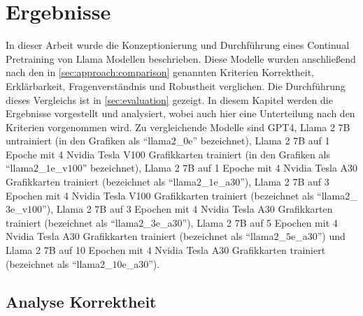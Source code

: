 \chapter{Ergebnisse}\label{ch:results}
In dieser Arbeit wurde die Konzeptionierung und Durchführung eines Continual Pretraining von Llama Modellen beschrieben.
Diese Modelle wurden anschließend nach den in \cref{sec:approach:comparison} genannten Kriterien Korrektheit, Erklärbarkeit, Fragenverständnis und Robustheit verglichen.
Die Durchführung dieses Vergleichs ist in \cref{sec:evaluation} gezeigt.
In diesem Kapitel werden die Ergebnisse vorgestellt und analysiert, wobei auch hier eine Unterteilung nach den Kriterien vorgenommen wird.
Zu vergleichende Modelle sind GPT4,
Llama 2 7B untrainiert (in den Grafiken als \enquote{llama$2$\_$0$e} bezeichnet),
Llama 2 7B auf 1 Epoche mit 4 Nvidia Tesla V100 Grafikkarten trainiert (in den Grafiken als \enquote{llama$2$\_$1$e\_v$100$} bezeichnet),
Llama 2 7B auf 1 Epoche mit 4 Nvidia Tesla A30 Grafikkarten trainiert (bezeichnet als \enquote{llama$2$\_$1$e\_a$30$}),
Llama 2 7B auf 3 Epochen mit 4 Nvidia Tesla V100 Grafikkarten trainiert (bezeichnet als \enquote{llama$2$\_$3$e\_v$100$}),
Llama 2 7B auf 3 Epochen mit 4 Nvidia Tesla A30 Grafikkarten trainiert (bezeichnet als \enquote{llama$2$\_$3$e\_a$30$}),
Llama 2 7B auf 5 Epochen mit 4 Nvidia Tesla A30 Grafikkarten trainiert (bezeichnet als \enquote{llama$2$\_$5$e\_a$30$}) und
Llama 2 7B auf 10 Epochen mit 4 Nvidia Tesla A30 Grafikkarten trainiert (bezeichnet als \enquote{llama$2$\_$10$e\_a$30$}).

\section{Analyse Korrektheit}\label{sec:results:correctness}
